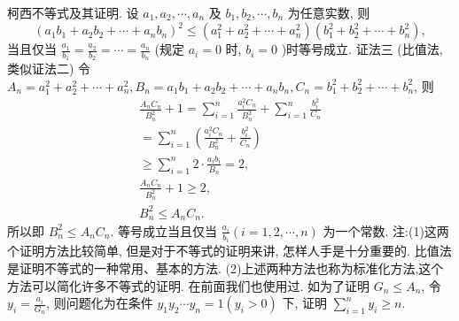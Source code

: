 柯西不等式及其证明.
设 $a_1, a_2, \cdots, a_n$ 及 $b_1, b_2, \cdots, b_n$ 为任意实数, 则
$$
\left(a_1 b_1+a_2 b_2+\cdots+a_n b_n\right)^2 \leqslant\left(a_1^2+a_2^2+\cdots+a_n^2\right)\left(b_1^2+b_2^2+\cdots+b_n^2\right),
$$
当且仅当 $\frac{a_1}{b_1}=\frac{a_2}{b_2}=\cdots=\frac{a_n}{b_n}$ (规定 $a_i=0$ 时, $b_i=0$ )时等号成立.
证法三 (比值法, 类似证法二)
令 $A_n=a_1^2+a_2^2+\cdots+a_n^2, B_n=a_1 b_1+a_2 b_2+\cdots+a_n b_n, C_n=b_1^2+ b_2^2+\cdots+b_n^2$, 则
$$
\begin{gathered}
\frac{A_n C_n}{B_n^2}+1=\sum_{i=1}^n \frac{a_i^2 C_n}{B_n^2}+\sum_{i=1}^n \frac{b_i^2}{C_n} \\
=\sum_{i=1}^n\left(\frac{a_i^2 C_n}{B_n^2}+\frac{b_i^2}{C_n}\right) \\
\geqslant \sum_{i=1}^n 2 \cdot \frac{a_i b_i}{B_n}=2, \\
\frac{A_n C_n}{B_n^2}+1 \geqslant 2, \\
B_n^2 \leqslant A_n C_n .
\end{gathered}
$$
所以即
$B_n^2 \leqslant A_n C_n$.
等号成立当且仅当 $\frac{a_i}{b_i}(i=1,2, \cdots, n)$ 为一个常数.
注:(1)这两个证明方法比较简单, 但是对于不等式的证明来讲, 怎样人手是十分重要的.
比值法是证明不等式的一种常用、基本的方法.
(2)上述两种方法也称为标准化方法,这个方法可以简化许多不等式的证明.
在前面我们也使用过.
如为了证明 $G_n \leqslant A_n$, 令 $y_i=\frac{a_i}{G_n}$, 则问题化为在条件 $y_1 y_2 \cdots y_n=1\left(y_i>0\right)$ 下, 证明 $\sum_{i=1}^n y_i \geqslant n$.



